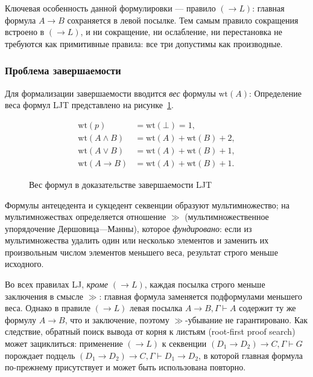 \documentclass[14pt, russian]{scrartcl}
\begin{document}
Ключевая особенность данной формулировки --- правило $(\rightarrow L)$: главная
формула $A \rightarrow B$ сохраняется в левой посылке. Тем самым правило
сокращения встроено в $(\rightarrow L)$, и ни сокращение, ни ослабление, ни
перестановка не требуются как примитивные правила: все три допустимы как
производные.

\subsubsection{Проблема завершаемости}

Для формализации завершаемости вводится \emph{вес} формулы $\mathrm{wt}(A)$:
Определение веса формул LJT представлено на рисунке~\ref{fig:ljt-formula-weights}.

\begin{figure}[!htb]
\centering
\begin{align*}
\mathrm{wt}(p) &= \mathrm{wt}(\bot) = 1, \\
\mathrm{wt}(A \land B) &= \mathrm{wt}(A) + \mathrm{wt}(B) + 2, \\
\mathrm{wt}(A \lor B) &= \mathrm{wt}(A) + \mathrm{wt}(B) + 1, \\
\mathrm{wt}(A \rightarrow B) &= \mathrm{wt}(A) + \mathrm{wt}(B) + 1.
\end{align*}
\caption{Вес формул в доказательстве завершаемости LJT}
\label{fig:ljt-formula-weights}
\end{figure}
Формулы антецедента и сукцедент секвенции образуют мультимножество; на
мультимножествах определяется отношение $\gg$ (мультимножественное упорядочение
Дершовица---Манны), которое \emph{фундировано}: если из мультимножества удалить
один или несколько элементов и заменить их произвольным числом элементов меньшего
веса, результат строго меньше исходного.

Во всех правилах LJ, \emph{кроме $(\rightarrow L)$}, каждая посылка строго
меньше заключения в смысле $\gg$: главная формула заменяется подформулами
меньшего веса. Однако в правиле $(\rightarrow L)$ левая посылка
$A \rightarrow B, \Gamma \vdash A$ содержит ту же формулу $A \rightarrow B$, что
и заключение, поэтому $\gg$-убывание не гарантировано. Как следствие, обратный
поиск вывода от корня к листьям (root-first proof search) может зациклиться:
применение $(\rightarrow L)$ к секвенции $(D_1 \rightarrow D_2) \rightarrow C,
\Gamma \vdash G$ порождает подцель $(D_1 \rightarrow D_2) \rightarrow C, \Gamma
\vdash D_1 \rightarrow D_2$, в которой главная формула по-прежнему присутствует и
может быть использована повторно.
\end{document}
